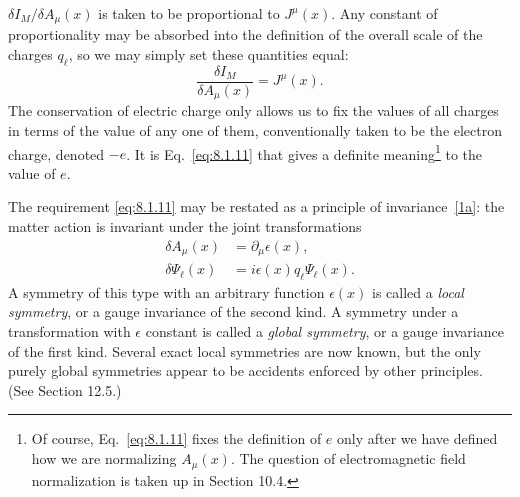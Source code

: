 $\delta I_M/\delta A_\mu(x)$ is taken to be proportional to $J^\mu(x)$. Any
constant of proportionality may be absorbed into the definition of the
overall scale of the charges $q_\ell$, so we may simply set these quantities
equal:
\begin{equation}
  \frac{\delta I_M}{\delta A_\mu(x)}=J^\mu(x).
  \tag{8.1.11}\label{eq:8.1.11}
\end{equation}
The conservation of electric charge only allows us to fix the values of all
charges in terms of the value of any one of them, conventionally taken to
be the electron charge, denoted $-e$. It is Eq.~\eqref{eq:8.1.11} that gives a definite
meaning\footnote{Of course, Eq.~\eqref{eq:8.1.11} fixes the definition of $e$ only after
we have defined how we are normalizing $A_\mu(x)$. The question of
electromagnetic field normalization is taken up in Section 10.4.} to the value
of $e$.

The requirement \eqref{eq:8.1.11} may be restated as a principle of invariance~\hyperref[ref:8.1a]{[1a]}:
the matter action is invariant under the joint transformations
\begin{align}
  \delta A_\mu(x)&=\partial_\mu\epsilon(x),
  \tag{8.1.12}\label{eq:8.1.12}\\
  \delta\Psi_\ell(x)&=i\epsilon(x)q_\ell\Psi_\ell(x).
  \tag{8.1.13}\label{eq:8.1.13}
\end{align}
A symmetry of this type with an arbitrary function $\epsilon(x)$ is called a
\textit{local symmetry}, or a gauge invariance of the second kind. A symmetry
under a transformation with $\epsilon$ constant is called a \textit{global
symmetry}, or a gauge invariance of the first kind. Several exact local
symmetries are now known, but the only purely global symmetries appear to be
accidents enforced by other principles. (See Section 12.5.)

